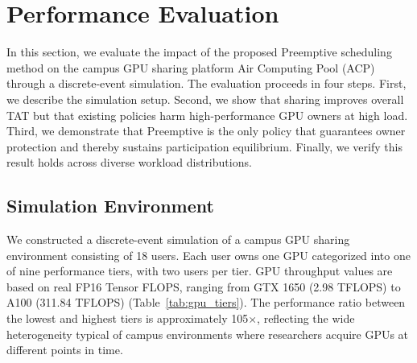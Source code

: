 
\section{Performance Evaluation}
\label{sec:evaluation}

In this section, we evaluate the impact of the proposed Preemptive scheduling method
on the campus GPU sharing platform Air Computing Pool (ACP)
through a discrete-event simulation.
The evaluation proceeds in four steps.
First, we describe the simulation setup.
Second, we show that sharing improves overall TAT but that existing policies
harm high-performance GPU owners at high load.
Third, we demonstrate that Preemptive is the only policy that guarantees
owner protection and thereby sustains participation equilibrium.
Finally, we verify this result holds across diverse workload distributions.

%

\subsection{Simulation Environment}
\label{sec:sim_env}

We constructed a discrete-event simulation of a campus GPU sharing environment
consisting of 18 users.
Each user owns one GPU categorized into one of nine performance tiers,
with two users per tier.
GPU throughput values are based on real FP16 Tensor FLOPS,
ranging from GTX 1650 (2.98 TFLOPS) to A100 (311.84 TFLOPS) (Table~\ref{tab:gpu_tiers}).
The performance ratio between the lowest and highest tiers is approximately 105$\times$,
reflecting the wide heterogeneity typical of campus environments
where researchers acquire GPUs at different points in time.

